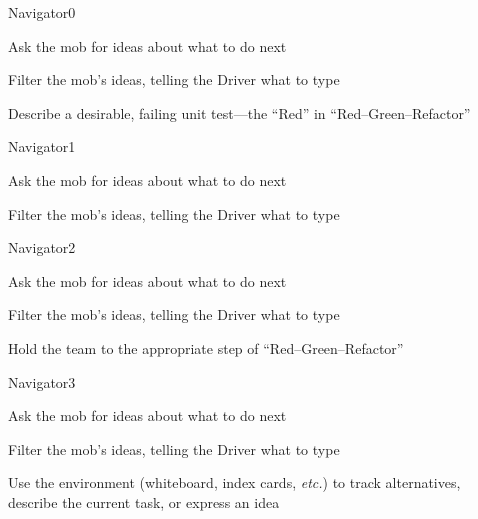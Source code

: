 \documentclass[letterpaper,20pt]{extarticle}
\begin{document}
\renewcommand{\blurb}{Provide direction to the team}

\begin{role}{Navigator}{0}
  \item Ask the mob for ideas about what to do next
  \item Filter the mob's ideas, telling the Driver what to type
  \item Describe a desirable, failing unit test---the ``Red'' in ``Red--Green--Refactor''
\end{role}

\begin{role}{Navigator}{1}
  \item Ask the mob for ideas about what to do next
  \item Filter the mob's ideas, telling the Driver what to type
\end{role}

\begin{role}{Navigator}{2}
  \item Ask the mob for ideas about what to do next
  \item Filter the mob's ideas, telling the Driver what to type
  \item Hold the team to the appropriate step of ``Red--Green--Refactor''
\end{role}

\begin{role}{Navigator}{3}
  \item Ask the mob for ideas about what to do next
  \item Filter the mob's ideas, telling the Driver what to type
  \item Use the environment (whiteboard, index cards, \textit{etc.}) to
    track alternatives, describe the current task, or express
    an idea
\end{role}
\end{document}

